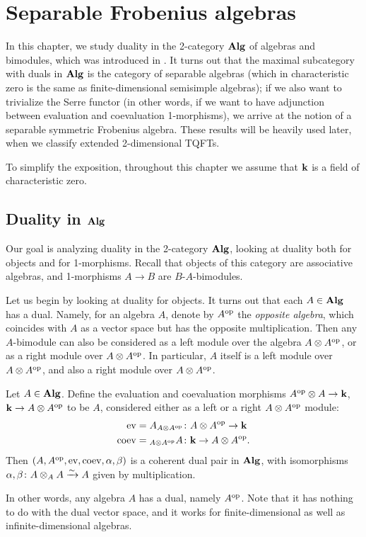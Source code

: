 \chapter{Separable Frobenius algebras}\label{c:separable-frobenius}

In this chapter, we study duality in the 2-category $\mathbf{Alg}$ of algebras and
bimodules, which was introduced in . It turns out that the maximal
subcategory with duals in $\mathbf{Alg}$ is the category of separable algebras (which in
characteristic zero is the same as finite-dimensional semisimple algebras); if
we also want to trivialize the Serre functor (in other words, if we want to have
adjunction between evaluation and coevaluation 1-morphisms), we arrive at the
notion of a separable symmetric Frobenius algebra. These results will be heavily
used later, when we classify extended 2-dimensional TQFTs.

To simplify the exposition, throughout this chapter we assume that $\mathbf{k}$ is a
field of characteristic zero.

\section{Duality in $\mathbf{Alg}$}\label{s:alg-duals}
Our goal is analyzing duality in the 2-category $\mathbf{Alg}$, looking at duality
both for objects and for 1-morphisms. Recall that objects of this category are
associative algebras, and 1-morphisms $A\to B$ are $B$-$A$-bimodules.


Let us begin by looking at duality for objects. It turns out that each $A\in
\mathbf{Alg}$ has a dual. Namely, for an algebra $A$, denote by
$A^{\mathrm{op}}$ the \emph{opposite algebra}, which coincides with $A$ as a vector space
but has the opposite multiplication. Then any $A$-bimodule can also be considered
as a left module over the algebra $A\otimes A^{\mathrm{op}}$, or as a right module over
$A\otimes A^{\mathrm{op}}$. In particular, $A$ itself is a left module over $A\otimes
A^{\mathrm{op}}$, and also a right module over $A\otimes
A^{\mathrm{op}}$.


\begin{theorem}\label{t:alg-duals1}
  Let $A\in \mathbf{Alg}$. Define the evaluation and coevaluation morphisms
  $A^{\mathrm{op}} \otimes A\to \mathbf{k}$, $\mathbf{k} \to A\otimes A^{\mathrm{op}}$
  to be $A$, considered either as a left or a right $A\otimes A^{\mathrm{op}}$ module:
  \begin{equation}\label{e:alg-duals1}
    \begin{aligned}
      \operatorname{ev} &= A_{A\otimes A^{\mathrm{op}}} \colon A\otimes A^{\mathrm{op}}\to \mathbf{k}\\
      \operatorname{coev} &= {}_{A\otimes A^{\mathrm{op}}} A \colon \mathbf{k} \to A\otimes A^{\mathrm{op}}.
    \end{aligned}
  \end{equation}
  Then $(A, A^{\mathrm{op}}, \operatorname{ev}, \operatorname{coev}, \alpha,\beta)$ is a coherent dual pair in $\mathbf{Alg}$,
  with isomorphisms $\alpha, \beta\colon A\otimes_A A \xrightarrow{\sim} A$ given by
  multiplication.
\end{theorem}
In other words, any algebra $A$ has a dual, namely $A^{\mathrm{op}}$.
Note that it has nothing to do with the dual vector space, and
it works for finite-dimensional as well as infinite-dimensional algebras.

